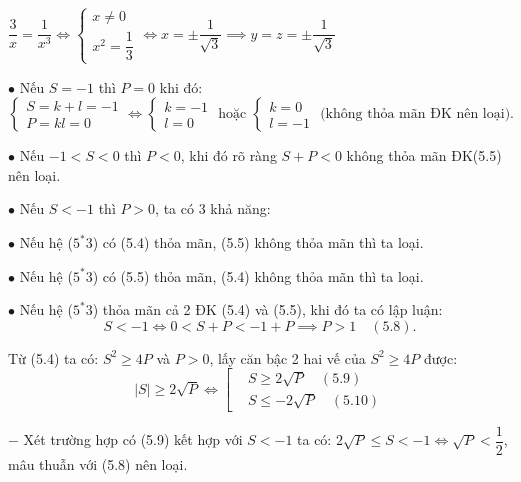 \documentclass[12pt]{report}
\begin{document}
\vspace{0.2cm}
\noindent $\dfrac{3}{x} = \dfrac{1}{x^3} \Leftrightarrow \begin{cases} x \neq 0 \\ x^2 = \dfrac{1}{3} \end{cases} \Leftrightarrow x = \pm \dfrac{1}{\sqrt{3}} \implies y = z = \pm \dfrac{1}{\sqrt{3}}$

\vspace{0.3cm}
\noindent $\bullet$ Nếu $S = -1$ thì $P = 0$ khi đó:
\[
\begin{cases} S = k + l = -1 \\ P = kl = 0 \end{cases} \Leftrightarrow \begin{cases} k = -1 \\ l = 0 \end{cases} \text{ hoặc } \begin{cases} k = 0 \\ l = -1 \end{cases} \text{ (không thỏa mãn ĐK nên loại).}
\]

\noindent $\bullet$ Nếu $-1 < S < 0$ thì $P < 0$, khi đó rõ ràng $S + P < 0$ không thỏa mãn ĐK(5.5) nên loại.

\vspace{0.2cm}
\noindent $\bullet$ Nếu $S < -1$ thì $P > 0$, ta có 3 khả năng:

\vspace{0.1cm}
\noindent $\bullet$ Nếu hệ ($5^*3$) có (5.4) thỏa mãn, (5.5) không thỏa mãn thì ta loại.

\vspace{0.1cm}
\noindent $\bullet$ Nếu hệ ($5^*3$) có (5.5) thỏa mãn, (5.4) không thỏa mãn thì ta loại.

\vspace{0.1cm}
\noindent $\bullet$ Nếu hệ ($5^*3$) thỏa mãn cả 2 ĐK (5.4) và (5.5), khi đó ta có lập luận:
\[
S < -1 \Leftrightarrow 0 < S + P < -1 + P \implies P > 1 \quad (5.8).
\]

\noindent Từ (5.4) ta có: $S^2 \geq 4P$ và $P > 0$, lấy căn bậc 2 hai vế của $S^2 \geq 4P$ được:
\[

|S| \geq 2\sqrt{P} \Leftrightarrow \left[ 
\begin{aligned}
&S \geq 2\sqrt{P} \quad (5.9) \\
&S \leq -2\sqrt{P} \quad (5.10)
\end{aligned} 
\right.
\]

\noindent $-$ Xét trường hợp có (5.9) kết hợp với $S < -1$ ta có: $2\sqrt{P} \leq S < -1 \Leftrightarrow \sqrt{P} < \dfrac{1}{2}$, mâu thuẫn với (5.8) nên loại.
\end{document}
